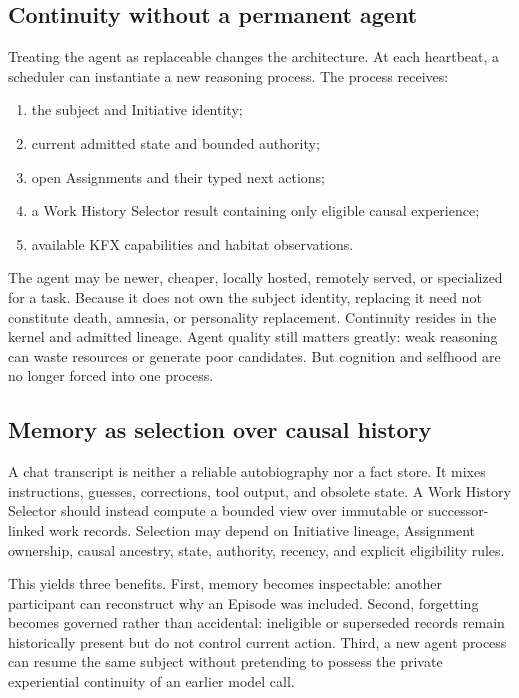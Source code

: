 \subsection{Continuity without a permanent agent}

Treating the agent as replaceable changes the architecture. At each heartbeat,
a scheduler can instantiate a new reasoning process. The process receives:

\begin{enumerate}[leftmargin=*]
  \item the subject and Initiative identity;
  \item current admitted state and bounded authority;
  \item open Assignments and their typed next actions;
  \item a Work History Selector result containing only eligible causal
  experience;
  \item available KFX capabilities and habitat observations.
\end{enumerate}

The agent may be newer, cheaper, locally hosted, remotely served, or specialized
for a task. Because it does not own the subject identity, replacing it need not
constitute death, amnesia, or personality replacement. Continuity resides in
the kernel and admitted lineage. Agent quality still matters greatly: weak
reasoning can waste resources or generate poor candidates. But cognition and
selfhood are no longer forced into one process.

\subsection{Memory as selection over causal history}

A chat transcript is neither a reliable autobiography nor a fact store. It
mixes instructions, guesses, corrections, tool output, and obsolete state.
A Work History Selector should instead compute a bounded view over immutable
or successor-linked work records. Selection may depend on Initiative lineage,
Assignment ownership, causal ancestry, state, authority, recency, and explicit
eligibility rules.

This yields three benefits. First, memory becomes inspectable: another
participant can reconstruct why an Episode was included. Second, forgetting
becomes governed rather than accidental: ineligible or superseded records
remain historically present but do not control current action. Third, a new
agent process can resume the same subject without pretending to possess the
private experiential continuity of an earlier model call.

